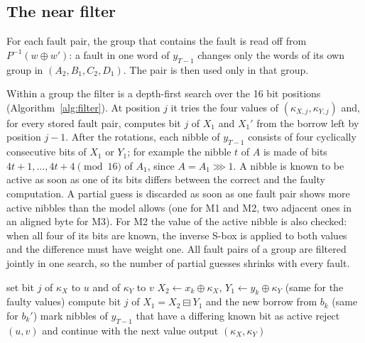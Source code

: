 \documentclass[pdflatex,sn-mathphys-num]{sn-jnl}
\theoremstyle{thmstyleone}%
\theoremstyle{thmstylethree}%
\begin{document}
\subsection{The near filter}\label{sec:filter}

For each fault pair, the group that contains the fault is read off from $P^{-1}(w\oplus w')$: a fault
in one word of $y_{T-1}$ changes only the words of its own group in $(A_2,B_1,C_2,D_1)$. The pair is
then used only in that group.

Within a group the filter is a depth-first search over the 16 bit positions
(Algorithm~\ref{alg:filter}). At position $j$ it tries the four values of
$(\kappa_{X,j},\kappa_{Y,j})$ and, for every stored fault pair, computes bit $j$ of $X_1$ and $X_1'$
from the borrow left by position $j-1$. After the rotations, each nibble of $y_{T-1}$ consists of four
cyclically consecutive bits of $X_1$ or $Y_1$; for example the nibble $t$ of $A$ is made of bits
$4t+1,\dots,4t+4 \pmod{16}$ of $A_1$, since $A = A_1\ggg 1$. A nibble is known to be active as soon as
one of its bits differs between the correct and the faulty computation. A partial guess is discarded
as soon as one fault pair shows more active nibbles than the model allows (one for M1 and M2, two
adjacent ones in an aligned byte for M3). For M2 the value of the active nibble is also checked: when all
four of its bits are known, the inverse S-box is applied to both values and the difference must have
weight one. All fault pairs of a group are filtered jointly in one search, so the number of partial
guesses shrinks with every fault.

\begin{algorithm}[t]
\caption{Near filter for one group $(X,Y)$ with fault pairs $(x_k,y_k,x_k',y_k')$, $k=1..n$}\label{alg:filter}
\begin{algorithmic}[1]
  \State set bit $j$ of $\kappa_X$ to $u$ and of $\kappa_Y$ to $v$
    \State $X_2\gets x_k\oplus\kappa_X$, $Y_1\gets y_k\oplus\kappa_Y$ (same for the faulty values)
    \State compute bit $j$ of $X_1 = X_2\boxminus Y_1$ and the new borrow from $b_k$ (same for $b_k'$)
    \State mark nibbles of $y_{T-1}$ that have a differing known bit as active
      \State reject $(u,v)$ and continue with the next value
    \EndIf
  \EndFor
   output $(\kappa_X,\kappa_Y)$ \Else\  \EndIf
\EndFor
\EndProcedure
\end{algorithmic}
\end{algorithm}
\end{document}
